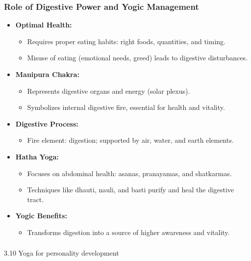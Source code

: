 \begin{frame}[fragile]\frametitle{Role of Digestive Power and Yogic Management}

    \begin{itemize}
        \item \textbf{Optimal Health:}
        \begin{itemize}
            \item Requires proper eating habits: right foods, quantities, and timing.
            \item Misuse of eating (emotional needs, greed) leads to digestive disturbances.
        \end{itemize}
        \item \textbf{Manipura Chakra:}
        \begin{itemize}
            \item Represents digestive organs and energy (solar plexus).
            \item Symbolizes internal digestive fire, essential for health and vitality.
        \end{itemize}
        \item \textbf{Digestive Process:}
        \begin{itemize}
            \item Fire element: digestion; supported by air, water, and earth elements.
        \end{itemize}
        \item \textbf{Hatha Yoga:}
        \begin{itemize}
            \item Focuses on abdominal health: asanas, pranayamas, and shatkarmas.
            \item Techniques like dhauti, nauli, and basti purify and heal the digestive tract.
        \end{itemize}
        \item \textbf{Yogic Benefits:}
        \begin{itemize}
            \item Transforms digestion into a source of higher awareness and vitality.
        \end{itemize}
    \end{itemize}

\end{frame}

\begin{frame}[fragile]\frametitle{}
\begin{center}
{\Large 3.10 Yoga for personality development}
\end{center}
\end{frame}

